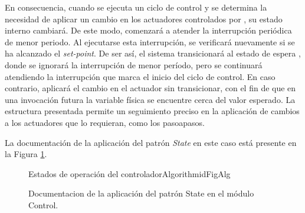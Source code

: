 \begin{figure}[H]
\begin{center}
\end{center}
\end{figure}


En consecuencia, cuando se ejecuta un ciclo de control y se determina la necesidad de aplicar un cambio en los actuadores controlados por \ControlSeguimiento, su estado interno cambiará. De este modo, comenzará a atender la interrupción periódica de menor periodo. Al ejecutarse esta interrupción, se verificará nuevamente si se ha alcanzado el \textit{set-point}. De ser así, el sistema transicionará al estado de espera \Waiting, donde se ignorará la interrupción de menor período, pero se continuará atendiendo la interrupción que marca el inicio del ciclo de control. En caso contrario, aplicará el cambio en el actuador sin transicionar, con el fin de que en una invocación futura la variable física se encuentre cerca del valor esperado. La estructura presentada permite un seguimiento preciso en la aplicación de cambios a los actuadores que lo requieran, como los \glspl{pasoapaso}.

La documentación de la aplicación del patrón \textit{State} en este caso está presente en la Figura \ref{docStateControl}.

\begin{figure}
\caption{Documentacion de la aplicación del patrón State en el módulo Control.}
\label{docStateControl}
\begin{pattern}[]{Estados de operación del controlador}{Algorithm}{idFigAlg}
\assigns
{}
\end{pattern}
\end{figure}


